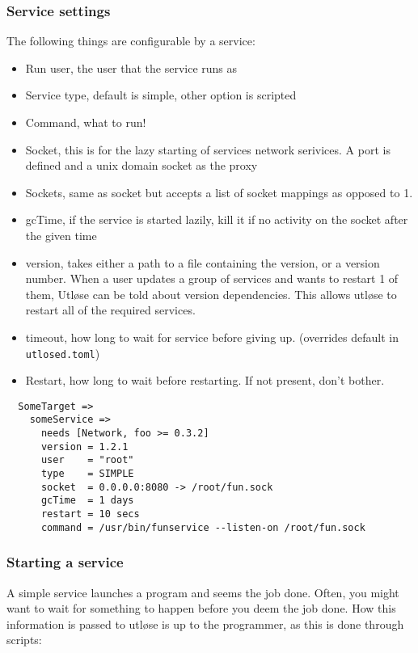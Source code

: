 \documentclass{article}
\begin{document}
\subsubsection{Service settings}
The following things are configurable by a service:
\begin{itemize}
  \item Run user, the user that the service runs as
  \item Service type, default is simple, other option is scripted
  \item Command, what to run!
  \item{
      Socket, this is for the lazy starting of services network serivices. A port is defined and a
      unix domain socket as the proxy}
  \item Sockets, same as socket but accepts a list of socket mappings as opposed to 1.
  \item gcTime, if the service is started lazily, kill it if no activity on the socket after the given time
  \item {
      version, takes either a path to a file containing the version, or a version number. When a user updates
      a group of services and wants to restart 1 of them, Utløse can be told about version dependencies.
      This allows utløse to restart all of the required services.
    }
  \item {timeout, how long to wait for service before giving up. (overrides default in \texttt{utlosed.toml})}
  \item Restart, how long to wait before restarting. If not present, don't bother.
\end{itemize}

\begin{verbatim}
  SomeTarget =>
    someService =>
      needs [Network, foo >= 0.3.2]
      version = 1.2.1
      user    = "root"
      type    = SIMPLE
      socket  = 0.0.0.0:8080 -> /root/fun.sock
      gcTime  = 1 days
      restart = 10 secs
      command = /usr/bin/funservice --listen-on /root/fun.sock
\end{verbatim}

\subsubsection{Starting a service}
A simple service launches a program and seems the job done. Often, you might want to
wait for something to happen before you deem the job done. How this information is passed to
utløse is up to the programmer, as this is done through scripts:
\end{document}

